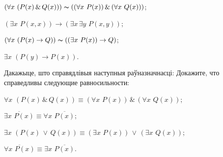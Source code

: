 \begin{problemList}
{\begin{belarusianEnumerate}
\item $(\forall x \,\, (P(x) \,\&\, Q(x))) \thicksim ((\forall x \,\, P(x)) \,\&\, (\forall x \,\, Q(x)))$;
\item $(\exists x \,\, P(x, x)) \to (\exists x \, \exists y \,\, P(x, y))$;
\item $(\forall x \,\, (P(x) \to Q)) \thicksim ((\exists x \,\, P(x)) \to Q)$;
\item $\exists x \,\, (P(y) \to P(x))$.
	
\end{belarusianEnumerate}
}

\bigskip

\problemItemWithCommonPart
{Дакажыце, што справядлівыя наступныя раўназначнасці:}
{Докажите, что справедливы следующие равносильности:}
{%
\begin{belarusianEnumerate}
	
\item $\forall x \,\, (P(x) \,\&\, Q(x)) \equiv (\forall x \,\, P(x)) \,\&\, (\forall x \,\, Q(x))$;
\item $\overline{\exists x \,\, P(x)} \equiv \forall x \,\, \overline{P(x)}$;
\item $\exists x \,\, (P(x) \,\vee\, Q(x)) \equiv (\exists x \,\, P(x)) \,\vee\, (\exists x \,\, Q(x))$;
\item $\overline{\forall x \,\, P(x)} \equiv \exists x \,\, \overline{P(x)}$.
	
\end{belarusianEnumerate}
}

\end{problemList}

